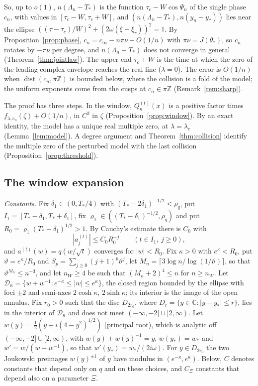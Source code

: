 \documentclass[11pt]{amsart}
\theoremstyle{definition}
\theoremstyle{remark}
\numberwithin{equation}{section}
\newcommand{\C}{\mathbb{C}}
\newcommand{\Z}{\mathbb{Z}}
\DeclareMathOperator{\dist}{dist}
\begin{document}
So, up to $o(1)$, $n(\Lambda_n-T_*)$ is the function $\tau_c-W\cos\Psi_n$ of the single phase $c_n$, with values in
$[\tau_c-W,\tau_c+W]$, and $(n(\Lambda_n-T_*),n(y_n-y_*))$ lies near the ellipse
$((\tau-\tau_c)/W)^2+(2\omega(\xi-\xi_r))^2=1$. By Proposition~\ref{prop:phase}, $c_n=c_\infty-n\pi\nu+O(1/n)$ with
$\pi\nu=J(\theta_*)$, so $c_n$ rotates by $-\pi\nu$ per degree, and $n(\Lambda_n-T_*)$ does not converge in general
(Theorem~\ref{thm:jointlaw}). The upper end $\tau_c+W$ is the time at which the zero of the leading complex envelope
reaches the real line ($\lambda=0$). The error is $O(1/n)$ when $\dist(c_n,\pi\Z)$ is bounded below, where the collision
is a fold of the model; the uniform exponents come from the cusps at $c_n\in\pi\Z$ (Remark~\ref{rem:sharp}).

The proof has three steps. In the window, $Q_n^{(t)}(x)$ is a positive factor times $f_{\lambda,c_n}(\zeta)+O(1/n)$, in
$C^2$ in $\zeta$ (Proposition~\ref{prop:window}). By an exact identity, the model has a unique real multiple zero, at
$\lambda=\lambda_{c}$ (Lemma~\ref{lem:model}). A degree argument and Theorem~\ref{thm:collision} identify the multiple zero
of the perturbed model with the last collision (Proposition~\ref{prop:threshold}).

\subsection{The window expansion}\label{sec:window}

\emph{Constants.} Fix $\delta_1\in(0,T_*/4)$ with $(T_*-2\delta_1)^{-1/2}<\rho_q$, put $I_1=[T_*-\delta_1,T_*+\delta_1]$, fix
$\varrho_1\in((T_*-\delta_1)^{-1/2},\rho_q)$ and put $R_0=\varrho_1(T_*-\delta_1)^{1/2}>1$. By Cauchy's estimate there is $C_0$
with
\begin{equation}\label{eq:F-coeff}
|a^{(t)}_j|\le C_0R_0^{-j}\qquad(t\in I_1,\ j\ge0),
\end{equation}
and $a^{(t)}(w)=q(w/\sqrt t)$ converges for $|w|<R_0$. Fix $\kappa>0$ with $e^\kappa<R_0$, put
$\vartheta=e^\kappa/R_0$ and $S_p=\sum_{j\ge0}(j+1)^p\vartheta^j$, let $M_n=\lceil3\log n/\log(1/\vartheta)\rceil$,
so that $\vartheta^{M_n}\le n^{-3}$, and let $n_W\ge4$ be such that $(M_n+2)^4\le n$ for $n\ge n_W$. Let
$\mathcal D_\kappa=\{w+w^{-1}:e^{-\kappa}\le|w|\le e^\kappa\}$, the closed region bounded by the ellipse with foci
$\pm2$ and semi-axes $2\cosh\kappa$, $2\sinh\kappa$; its interior is the image of the open annulus. Fix $r_0>0$ such
that the disc $D_{2r_0}$, where $D_r=\{y\in\C:|y-y_*|\le r\}$, lies in the interior of $\mathcal D_\kappa$ and does not
meet $(-\infty,-2]\cup[2,\infty)$. Let $w(y)=\frac12(y+i(4-y^2)^{1/2})$ (principal root), which is analytic off
$(-\infty,-2]\cup[2,\infty)$, with $w(y)+w(y)^{-1}=y$, $w(y_*)=w_*$ and $w'=w/(w-w^{-1})$, so that
$w'(y_*)=w_*/(2i\omega)$. For $y\in D_{2r_0}$ the two Joukowski preimages $w(y)^{\pm1}$ of $y$ have modulus in
$(e^{-\kappa},e^\kappa)$. Below, $C$ denotes constants that depend only on $q$ and on these choices, and $C_\Xi$ constants
that depend also on a parameter $\Xi$.
\end{document}

